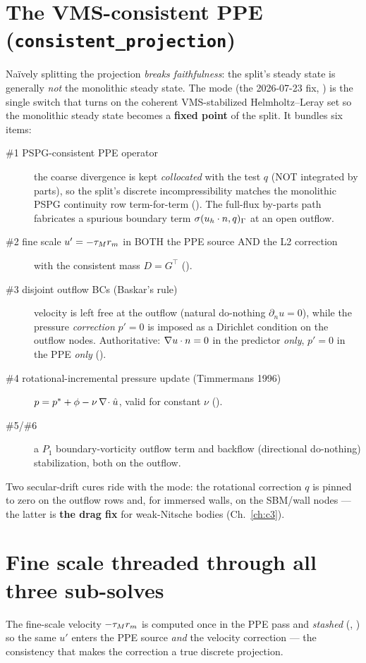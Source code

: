 \section{The VMS-consistent PPE (\texttt{consistent\_projection})}
Na\"ively splitting the projection \emph{breaks faithfulness}: the split's
steady state is generally \emph{not} the monolithic steady state. The
 mode (the 2026-07-23 fix,
) is the single switch that turns on the coherent
VMS-stabilized Helmholtz--Leray set so the monolithic steady state becomes
a \textbf{fixed point} of the split. It bundles six items:
\begin{description}
\item[\#1 PSPG-consistent PPE operator] the coarse divergence is kept
  \emph{collocated} with the test $q$ (NOT integrated by parts), so the
  split's discrete incompressibility matches the monolithic PSPG continuity
  row term-for-term (). The full-flux by-parts
  path fabricates a spurious boundary term $\sigma(u_h\cdot n,q)_\Gamma$ at
  an open outflow.
\item[\#2 fine scale $u'=-\tau_M r_m$ in BOTH the PPE source AND the L2
  correction] with the consistent mass $D=G^\top$ ().
\item[\#3 disjoint outflow BCs (Baskar's rule)] velocity is left free at the
  outflow (natural do-nothing $\partial_n u=0$), while the pressure
  \emph{correction} $p'=0$ is imposed as a Dirichlet condition on the
  outflow nodes. Authoritative: $\nabla u\cdot n=0$ in the predictor
  \emph{only}, $p'=0$ in the PPE \emph{only} ().
\item[\#4 rotational-incremental pressure update (Timmermans 1996)]
  $p=p^{*}+\phi-\nu\,\nabla\!\cdot\hat u$, valid for constant $\nu$
  ().
\item[\#5/\#6] a $P_1$ boundary-vorticity outflow term and backflow
  (directional do-nothing) stabilization, both on the outflow.
\end{description}
Two secular-drift cures ride with the mode: the rotational correction $q$
is pinned to zero on the outflow rows and, for immersed walls, on the
SBM/wall nodes --- the latter is \textbf{the drag fix} for weak-Nitsche
bodies (Ch.~\ref{ch:c3}).

\section{Fine scale threaded through all three sub-solves}
The fine-scale velocity $-\tau_M r_m$ is computed once in the PPE pass and
\emph{stashed} (, ) so the same $u'$ enters
the PPE source \emph{and} the velocity correction --- the consistency that
makes the correction a true discrete projection.

